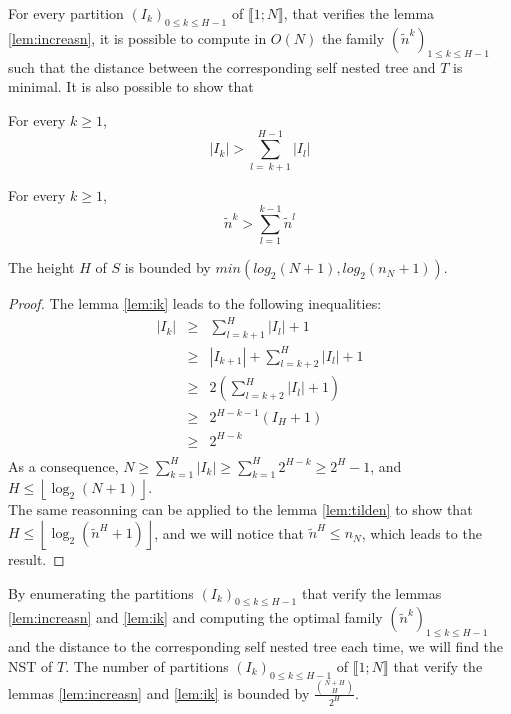 For every partition $(I_{k})_{0 \leqslant k \leqslant H-1}$ of
$\llbracket 1;N \rrbracket$, that verifies the lemma
\ref{lem:increasn}, it is possible to compute in $O(N)$ the family
$(\tilde{n}^{k})_{1 \leqslant k \leqslant H-1}$ such that the distance
between the corresponding self nested tree and $T$ is minimal. It is
also possible to show that

\begin{lem}
  \label{lem:ik}
  For every $k \geqslant 1$,
  $$|I_{k}| > \sum_{l = \ k+1}^{H-1} |I_{l}|$$
\end{lem}

\begin{lem}
  \label{lem:tilden}
  For every $k \geqslant 1$,
  $$\tilde{n}^{k} > \sum_{l = 1}^{k-1} \tilde{n}^{l}$$
\end{lem}
 
\begin{cor}
  The height $H$ of $S$ is bounded by $min(log_{2}(N+1),
  log_{2}(n_{N}+1))$.
  \begin{proof}
    The lemma \ref{lem:ik} leads to the following inequalities: 
    $$
    \begin{array}{rcl}
      |I_{k}| &\geqslant& \sum_{l=k+1}^{H} |I_{l}| + 1\\
              &\geqslant& |I_{k+1}| + \sum_{l=k+2}^{H} |I_{l}| + 1 \\
              &\geqslant& 2(\sum_{l=k+2}^{H} |I_{l}| + 1) \\
              &\geqslant& 2^{H-k-1}(I_{H} +1)\\
              &\geqslant& 2^{H-k}\\
    \end{array}
    $$
    As a consequence,
    $N \geqslant \sum_{k=1}^{H} |I_{k}| \geqslant \sum_{k=1}^{H}
    2^{H-k} \geqslant 2^{H} -1$,
    and $H \leqslant \left\lfloor \log_{2}(N+1) \right\rfloor$.\\
    The same reasonning can be applied to the lemma \ref{lem:tilden}
    to show that $H \leqslant \left\lfloor \log_{2}(\tilde{n}^{H}+1)
    \right\rfloor$, and we will notice that $\tilde{n}^{H} \leqslant
    n_{N}$, which leads to the result.
  \end{proof}
\end{cor}

By enumerating the partitions $(I_{k})_{0 \leqslant k \leqslant H-1}$
that verify the lemmas \ref{lem:increasn} and \ref{lem:ik} and
computing the optimal family
$(\tilde{n}^{k})_{1 \leqslant k \leqslant H-1}$ and the distance to
the corresponding self nested tree each time, we will find the NST of
$T$. The number of partitions $(I_{k})_{0 \leqslant k \leqslant H-1}$
of $\llbracket 1;N \rrbracket$ that verify the lemmas
\ref{lem:increasn} and \ref{lem:ik} is bounded by
$\frac{\binom{N+H}{H}}{2^H}$. 

